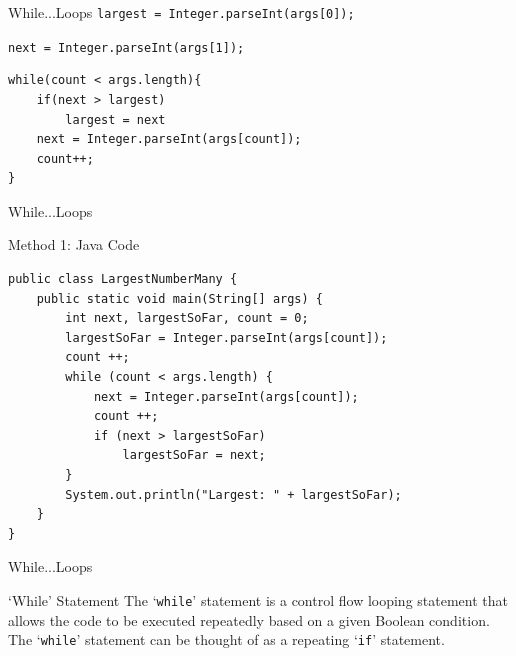 \documentclass[14pt]{beamer}
\begin{document}
\begin{frame}[fragile]{While...Loops}
 \lstinline!largest = Integer.parseInt(args[0]);!
 
 \lstinline!next = Integer.parseInt(args[1]);!
 
 \begin{lstlisting}[numbers=none]
while(count < args.length){
    if(next > largest)
        largest = next
    next = Integer.parseInt(args[count]);
    count++;
}                 
 \end{lstlisting}
\end{frame}

\begin{frame}[fragile]{While...Loops}
 \begin{block}{Method 1: Java Code}
  \begin{lstlisting}[numbers=none]
public class LargestNumberMany {
    public static void main(String[] args) {
        int next, largestSoFar, count = 0;
        largestSoFar = Integer.parseInt(args[count]);
        count ++;
        while (count < args.length) {
            next = Integer.parseInt(args[count]);
            count ++;
            if (next > largestSoFar)
                largestSoFar = next;
        }
        System.out.println("Largest: " + largestSoFar);
    }
}
  \end{lstlisting}

 \end{block}

\end{frame}

\begin{frame}[fragile]{While...Loops}
 \begin{block}{`While' Statement}
 The `\lstinline!while!' statement is a control flow looping statement that allows the code to be executed repeatedly based on a given Boolean condition. The `\lstinline!while!' statement can be thought of as a repeating `\lstinline!if!' statement. 
 \end{block}
\end{frame}
 
\end{document}
